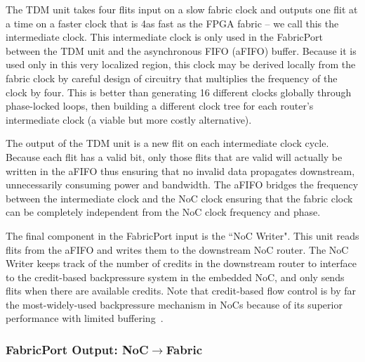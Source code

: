 The TDM unit takes four flits input on a slow fabric clock and outputs one flit at a time on a faster clock that is 4\xx as fast as the FPGA fabric -- we call this the intermediate clock.
This intermediate clock is only used in the FabricPort between the TDM unit and the asynchronous FIFO (aFIFO) buffer.
Because it is used only in this very localized region, this clock may be derived locally from the fabric clock by careful design of circuitry that multiplies the frequency of the clock by four.
This is better than generating 16 different clocks globally through phase-locked loops, then building a different clock tree for each router's intermediate clock (a viable but more costly alternative).

The output of the TDM unit is a new flit on each intermediate clock cycle.
Because each flit has a valid bit, only those flits that are valid will actually be written in the aFIFO thus ensuring that no invalid data propagates downstream, unnecessarily consuming power and bandwidth.
The aFIFO bridges the frequency between the intermediate clock and the NoC clock ensuring that the fabric clock can be completely independent from the NoC clock frequency and phase.

The final component in the FabricPort input is the ``NoC Writer".
This unit reads flits from the aFIFO and writes them to the downstream NoC router.
The NoC Writer keeps track of the number of credits in the downstream router to interface to the credit-based backpressure system in the embedded NoC, and only sends flits when there are available credits.
Note that credit-based flow control is by far the most-widely-used backpressure mechanism in NoCs because of its superior performance with limited buffering~\cite{dally_book}.

%
\subsubsection{FabricPort Output: NoC$\rightarrow$Fabric}
%

